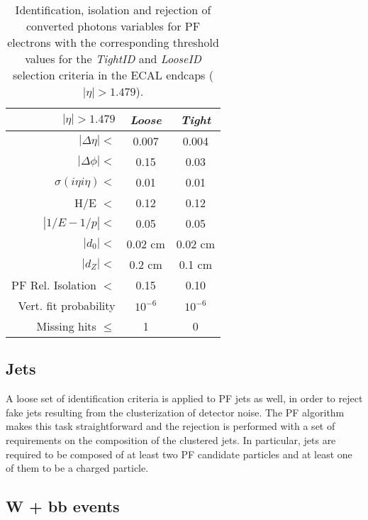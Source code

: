 \begin{table}[h]
\begin{center}
\begin{tabular}{rcc}
\hline
$|\eta| > 1.479$ & \textit{Loose} & \textit{Tight}\\
\hline
$|\Delta\eta| <$ & 0.007 & 0.004\\
$|\Delta\phi| <$  & 0.15 & 0.03 \\
$\sigma(i\eta i\eta) <$   & 0.01 & 0.01 \\
H/E $<$  & 0.12 & 0.12 \\
$|1/E - 1/p| <$   & 0.05 & 0.05 \\
\hline
$|d_{0}| <$ & 0.02 cm & 0.02 cm \\
$|d_{Z}| <$  & 0.2 cm & 0.1 cm \\
\hline
PF Rel. Isolation $<$ & 0.15 & 0.10 \\
\hline
Vert. fit probability  & $10^{-6}$ & $10^{-6}$\\
Missing hits $\leq$    & 1 & 0\\
 \hline
\end{tabular}
\end{center}
\caption{Identification, isolation and rejection of converted photons
  variables for PF electrons with the corresponding threshold values for 
  the \textit{TightID} and \textit{LooseID} selection criteria in the 
  ECAL endcaps ($|\eta| > 1.479$).}
\label{tab:elecutsendcaps}
\end{table}

\subsection{Jets}
A loose set of identification criteria is applied to PF jets as well, 
in order to reject fake jets resulting from the clusterization of detector noise.
The PF algorithm makes this task straightforward and the rejection is performed 
with a set of requirements on the composition of the clustered jets.
In particular, jets are required to be composed of at least two PF candidate 
particles and at least one of them to be a charged particle. 


\subsection{W + bb events}
\label{sec:wbbselection}

